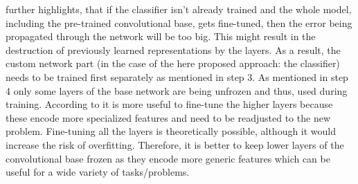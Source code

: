 \citet{Chollet:2017:DeepLearningPython} further highlights, that if the classifier isn't already trained and the whole model, including the pre-trained convolutional base, gets fine-tuned, then the error being propagated through the network will be too big. This might result in the destruction of previously learned representations by the layers. As a result, the custom network part (in the case of the here proposed approach: the classifier) needs to be trained first separately as mentioned in step 3. 
\newline\newline
As mentioned in step 4 only some layers of the base network are being unfrozen and thus, used during training. According to \citet{Chollet:2017:DeepLearningPython} it is more useful to fine-tune the higher layers because these encode more specialized features and need to be readjusted to the new problem. Fine-tuning all the layers is theoretically possible, although it would increase the risk of overfitting. Therefore, it is better to keep lower layers of the convolutional base frozen as they encode more generic features which can be useful for a wide variety of tasks/problems.




